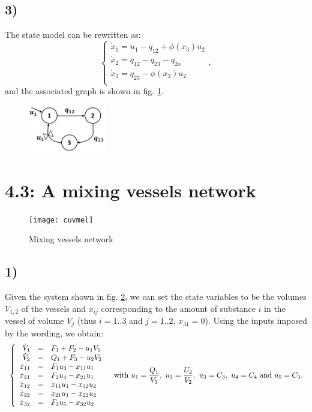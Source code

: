 \subsection*{3)}
The state model can be rewritten as:
\begin{equation}
\left\{
  \begin{array}{l}
  \dot{x}_1=u_1-q_{12}+\phi(x_3)u_2\\
  \dot{x}_2=q_{12}-q_{23}-q_{2o}\\
  \dot{x}_3=q_{23}-\phi(x_3)u_2\\
  \end{array} \right.,
\label{eq:statemod2}
\end{equation}
and the associated graph is shown in fig. \ref{graph2}.\\

\begin{figure}[h!]
  \centering
  \includegraphics[width=0.3\textwidth]{graph2}
  \caption{}
  \label{graph2}
\end{figure}


\section*{4.3: A mixing vessels network}
\begin{figure}[h!]
  \centering
  \texttt{[image: cuvmel]}
  \caption{Mixing vessels network}
  \label{cuvmel}
\end{figure}
\subsection*{1)}
Given the system shown in fig. \ref{cuvmel}, we can set the state variables to be the volumes $V_{1,2}$ of the vessels and $x_{ij}$ corresponding to the amount of substance $i$ in the vessel of volume $V_j$ (thus $i=1..3$ and $j=1..2$, $x_{31}=0$). Using the inputs imposed by the wording, we obtain:
\begin{equation}
\begin{array}{l l}
\left\{
  \begin{array}{r c l}
  \dot{V}_1&=&F_1+F_2-u_1V_1\\
  \dot{V}_2&=&Q_1+F_3-u_2V_2\\
  \dot{x}_{11}&=&F_1u_3- x_{11}u_1\\
  \dot{x}_{21}&=&F_2u_4-x_{21}u_1 \\ 
  \dot{x}_{12}&=&x_{11}u_1-x_{12}u_2\\
  \dot{x}_{22}&=&x_{21}u_1-x_{22}u_2 \\
  \dot{x}_{32}&=&F_3u_5-x_{32}u_2 \\
  \end{array} \right.
  & \textnormal{with } u_1=\dfrac{Q_1}{V_1},~u_2=\dfrac{U_2}{V_2},~u_3=C_3,~u_4=C_4\textnormal{ and }u_5=C_3.\\
  \end{array}
\label{eq:statemodel3}
\end{equation}

